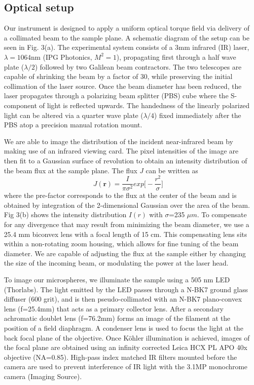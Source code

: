 \subsection*{Optical setup}
Our instrument is designed to apply a uniform optical torque field via delivery of a collimated beam to the sample plane. A schematic diagram of the setup can be seen in Fig. 3(a). The experimental system consists of a 3mm infrared (IR) laser, $\lambda=1064$nm (IPG Photonics, $M^{2}=1$), propagating first through a half wave plate ($\lambda/2$) followed by two Galilean beam contractors. The two telescopes are capable of shrinking the beam by a factor of 30, while preserving the initial collimation of the laser source. Once the beam diameter has been reduced, the laser propagates through a polarizing beam splitter (PBS) cube where the S-component of light is reflected upwards. The handedness of the linearly polarized light can be altered via a quarter wave plate ($\lambda/4$) fixed immediately after the PBS atop a precision manual rotation mount. 

We are able to image the distribution of the incident near-infrared beam by making use of an infrared viewing card. The pixel intensities of the image are then fit to a Gaussian surface of revolution to obtain an intensity distribution of the beam flux at the sample plane. The flux $J$ can be written as 
\begin{equation}
J(\textbf{r})=\frac{I}{\pi\sigma^{2}}exp\bigg[-\frac{r^{2}}{\sigma}\bigg]\end{equation}
where the pre-factor corresponds to the flux at the center of the beam and is obtained by integration of the 2-dimensional Gaussian over the area of the beam.
Fig 3(b) shows the intensity distribution $I(r)$ with $\sigma$=235 $\mu m$. To compensate for any divergence that may result from minimizing the beam diameter, we use a 25.4 mm biconvex lens with a focal length of 15 cm. This compensating lens sits within a non-rotating zoom housing, which allows for fine tuning of the beam diameter. We are capable of adjusting the flux at the sample either by changing the size of the incoming beam, or modulating the power at the laser head. 

To image our microspheres, we illuminate the sample using a 505 nm LED (Thorlabs). The light emitted by the LED passes through a N-BK7 ground glass diffuser (600 grit), and is then pseudo-collimated with an N-BK7 plano-convex lens (f=25.4mm) that acts as a primary collector lens. After a secondary achromatic doublet lens (f=76.2mm) forms an image of the filament at the position of a field diaphragm. A condenser lens is used to focus the light at the back focal plane of the objective. Once Köhler illumination is achieved, images of the focal plane are obtained using an infinity corrected Leica HCX PL APO 40x objective (NA=0.85). High-pass index matched IR filters mounted before the camera are used to prevent interference of IR light with the 3.1MP monochrome camera (Imaging Source). 